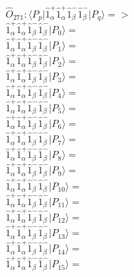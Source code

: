 \documentclass[14pt]{article}
\begin{document}
    $\hat{O}_{271}:  \langle{P_p}\vert \hat{1}_{\alpha}^{+}\hat{1}_{\alpha}^{+}\hat{1}_{\beta}^{-}\hat{1}_{\beta}^{-} \vert{P_q}\rangle => $ \\ 
    $ \hat{1}_{\alpha}^{+}\hat{1}_{\alpha}^{+}\hat{1}_{\beta}^{-}\hat{1}_{\beta}^{-} \vert{P_{0}}\rangle =  $ \\ 
    $ \hat{1}_{\alpha}^{+}\hat{1}_{\alpha}^{+}\hat{1}_{\beta}^{-}\hat{1}_{\beta}^{-} \vert{P_{1}}\rangle =  $ \\ 
    $ \hat{1}_{\alpha}^{+}\hat{1}_{\alpha}^{+}\hat{1}_{\beta}^{-}\hat{1}_{\beta}^{-} \vert{P_{2}}\rangle =  $ \\ 
    $ \hat{1}_{\alpha}^{+}\hat{1}_{\alpha}^{+}\hat{1}_{\beta}^{-}\hat{1}_{\beta}^{-} \vert{P_{3}}\rangle =  $ \\ 
    $ \hat{1}_{\alpha}^{+}\hat{1}_{\alpha}^{+}\hat{1}_{\beta}^{-}\hat{1}_{\beta}^{-} \vert{P_{4}}\rangle =  $ \\ 
    $ \hat{1}_{\alpha}^{+}\hat{1}_{\alpha}^{+}\hat{1}_{\beta}^{-}\hat{1}_{\beta}^{-} \vert{P_{5}}\rangle =  $ \\ 
    $ \hat{1}_{\alpha}^{+}\hat{1}_{\alpha}^{+}\hat{1}_{\beta}^{-}\hat{1}_{\beta}^{-} \vert{P_{6}}\rangle =  $ \\ 
    $ \hat{1}_{\alpha}^{+}\hat{1}_{\alpha}^{+}\hat{1}_{\beta}^{-}\hat{1}_{\beta}^{-} \vert{P_{7}}\rangle =  $ \\ 
    $ \hat{1}_{\alpha}^{+}\hat{1}_{\alpha}^{+}\hat{1}_{\beta}^{-}\hat{1}_{\beta}^{-} \vert{P_{8}}\rangle =  $ \\ 
    $ \hat{1}_{\alpha}^{+}\hat{1}_{\alpha}^{+}\hat{1}_{\beta}^{-}\hat{1}_{\beta}^{-} \vert{P_{9}}\rangle =  $ \\ 
    $ \hat{1}_{\alpha}^{+}\hat{1}_{\alpha}^{+}\hat{1}_{\beta}^{-}\hat{1}_{\beta}^{-} \vert{P_{10}}\rangle =  $ \\ 
    $ \hat{1}_{\alpha}^{+}\hat{1}_{\alpha}^{+}\hat{1}_{\beta}^{-}\hat{1}_{\beta}^{-} \vert{P_{11}}\rangle =  $ \\ 
    $ \hat{1}_{\alpha}^{+}\hat{1}_{\alpha}^{+}\hat{1}_{\beta}^{-}\hat{1}_{\beta}^{-} \vert{P_{12}}\rangle =  $ \\ 
    $ \hat{1}_{\alpha}^{+}\hat{1}_{\alpha}^{+}\hat{1}_{\beta}^{-}\hat{1}_{\beta}^{-} \vert{P_{13}}\rangle =  $ \\ 
    $ \hat{1}_{\alpha}^{+}\hat{1}_{\alpha}^{+}\hat{1}_{\beta}^{-}\hat{1}_{\beta}^{-} \vert{P_{14}}\rangle =  $ \\ 
    $ \hat{1}_{\alpha}^{+}\hat{1}_{\alpha}^{+}\hat{1}_{\beta}^{-}\hat{1}_{\beta}^{-} \vert{P_{15}}\rangle =  $ \\ 
    
\end{document}
